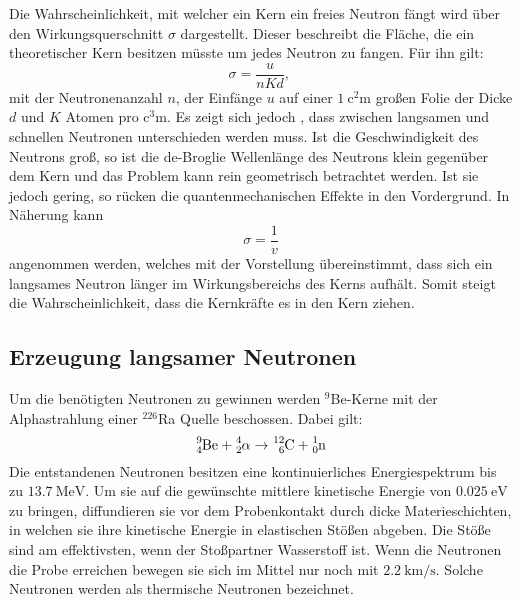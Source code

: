 Die Wahrscheinlichkeit, mit welcher ein Kern ein freies Neutron fängt wird über den Wirkungsquerschnitt $\sigma$ dargestellt. Dieser beschreibt die Fläche, die ein theoretischer Kern besitzen müsste um jedes Neutron zu fangen. Für ihn gilt:
\begin{equation}
  \sigma = \frac{u}{n K d}\text{, }
\end{equation}
mit der Neutronenanzahl $n$, der Einfänge $u$ auf einer $\SI{1}{\square\centi\meter}$ großen Folie der Dicke $d$ und $K$ Atomen pro $\si{\cubic\centi\meter}$.
 Es zeigt sich jedoch , dass zwischen langsamen und schnellen Neutronen unterschieden werden muss. Ist die Geschwindigkeit des Neutrons groß, so ist die de-Broglie Wellenlänge des Neutrons klein gegenüber dem Kern und das Problem kann rein geometrisch betrachtet werden. Ist sie jedoch gering, so rücken die quantenmechanischen Effekte in den Vordergrund. In Näherung kann
 \begin{equation}
   \sigma = \frac{1}{v}
 \end{equation}
 angenommen werden, welches mit der Vorstellung übereinstimmt, dass sich ein langsames Neutron länger im Wirkungsbereichs des Kerns aufhält. Somit steigt die Wahrscheinlichkeit, dass die Kernkräfte es in den Kern ziehen.
 \subsection{Erzeugung langsamer Neutronen}
 Um die benötigten Neutronen zu gewinnen werden $^9$Be-Kerne mit der Alphastrahlung einer $^{226}$Ra Quelle beschossen. Dabei gilt:
\begin{equation}
  \ce{^{9}_{4}Be} + \ce{^{4}_{2}\alpha} \rightarrow \ce{^{12}_{6}C} + \ce{^{1}_{0}n}
\end{equation}
 Die entstandenen Neutronen besitzen eine kontinuierliches Energiespektrum bis zu $\SI{13.7}{\mega\electronvolt}$. Um sie auf die gewünschte mittlere kinetische Energie von $\SI{0.025}{\electronvolt}$ zu bringen, diffundieren sie vor dem Probenkontakt durch dicke Materieschichten, in welchen sie ihre kinetische Energie in elastischen Stößen abgeben. Die Stöße sind am effektivsten, wenn der Stoßpartner Wasserstoff ist. Wenn die Neutronen die Probe erreichen bewegen sie sich im Mittel nur noch mit $\SI{2.2}{\kilo\meter\per\second}$. Solche Neutronen werden als thermische Neutronen bezeichnet.
